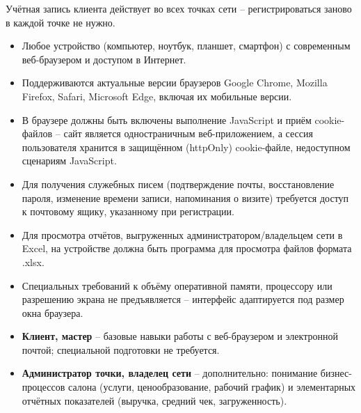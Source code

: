 Учётная запись клиента действует во всех точках сети -- регистрироваться
заново в каждой точке не нужно.



\begin{itemize}
  \item Любое устройство (компьютер, ноутбук, планшет, смартфон) с
        современным веб-браузером и доступом в Интернет.
  \item Поддерживаются актуальные версии браузеров Google Chrome, Mozilla
        Firefox, Safari, Microsoft Edge, включая их мобильные версии.
  \item В браузере должны быть включены выполнение JavaScript и приём
        cookie-файлов -- сайт является одностраничным веб-приложением, а
        сессия пользователя хранится в защищённом (httpOnly) cookie-файле,
        недоступном сценариям JavaScript.
  \item Для получения служебных писем (подтверждение почты, восстановление
        пароля, изменение времени записи, напоминания о визите) требуется
        доступ к почтовому ящику, указанному при регистрации.
  \item Для просмотра отчётов, выгруженных администратором\slash владельцем сети
        в Excel, на устройстве должна быть программа для просмотра файлов
        формата .xlsx.
  \item Специальных требований к объёму оперативной памяти, процессору или
        разрешению экрана не предъявляется -- интерфейс адаптируется под
        размер окна браузера.
\end{itemize}


\begin{itemize}
  \item \textbf{Клиент, мастер} -- базовые навыки работы с веб-браузером и
        электронной почтой; специальной подготовки не требуется.
  \item \textbf{Администратор точки, владелец сети} -- дополнительно:
        понимание бизнес-процессов салона (услуги, ценообразование,
        рабочий график) и элементарных отчётных показателей (выручка,
        средний чек, загруженность).
\end{itemize}

